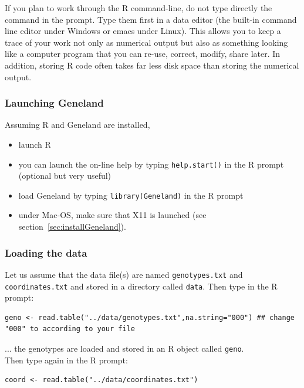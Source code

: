 \documentclass[a4paper,10pt]{article}
\begin{document}
If you plan to work through the R command-line, do not type directly the command in the prompt. 
Type them first in a data editor (the built-in command line editor under Windows or emacs under Linux). 
This allows you to keep a trace of your work not only as numerical output but also as something looking like 
a computer program that you can 
re-use, correct, modify, share later. In addition, storing R code often takes far less disk space than storing 
the numerical output.

\subsubsection{Launching {\sc Geneland}}
Assuming R and {\sc Geneland} are installed, 
\begin{itemize}
\item launch R
\item you can launch the on-line help by typing {\tt help.start()} in the R prompt (optional but very useful)
\item load {\sc Geneland} by typing {\tt library(Geneland)} in the R prompt
\item under Mac-OS, make sure that   X11 is launched (see section~\ref{sec:installGeneland}).
\end{itemize}

\subsubsection{Loading the data}


Let us assume that the data file(s) are named \texttt{genotypes.txt} and \texttt{coordinates.txt} 
and stored in a directory called \texttt{data}.
Then type in the R prompt:

\begin{verbatim}
geno <- read.table("../data/genotypes.txt",na.string="000") ## change "000" to according to your file
\end{verbatim}



... the genotypes are loaded and stored in an R object called \texttt{geno}.\\


Then type again in the R prompt:

\begin{verbatim}
coord <- read.table("../data/coordinates.txt")
\end{verbatim}
\end{document}
